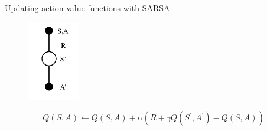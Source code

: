 \bgroup
\begin{frame}{Updating action-value functions with SARSA}
\begin{figure}
\centering
\includegraphics[width=0.2\textwidth]{img/sarsa.pdf}
\end{figure}
\begin{equation*}
Q(S,A) \leftarrow Q(S,A) + \alpha (R + \gamma Q(S^{\prime}, A^{\prime}) - Q(S,A))
\end{equation*}
\end{frame}
\egroup